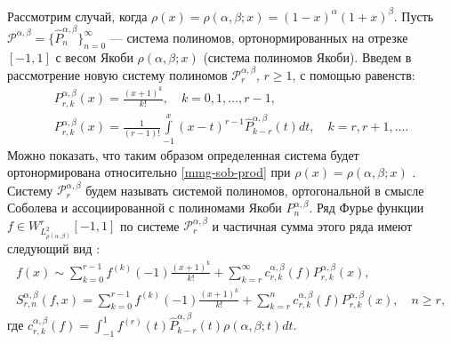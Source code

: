 Рассмотрим случай, когда $\rho(x)=\rho(\alpha,\beta; x)=(1-x)^\alpha(1+x)^\beta$. Пусть $\mathcal{P}^{\alpha,\beta}=\{ \hat{P}_n^{\alpha,\beta} \}_{n=0}^\infty$ --- система полиномов, ортонормированных на отрезке $[-1,1]$ с весом Якоби $\rho(\alpha,\beta; x)$ (система полиномов Якоби). Введем в рассмотрение новую систему полиномов $\mathcal{P}^{\alpha,\beta}_r$, $r \ge 1$, с помощью равенств:
\begin{gather}
	\label{mmg-sob-def1-intro}
	P_{r,k}^{\alpha,\beta}(x) =\frac{(x+1)^k}{k!}, \quad k=0,1,\ldots, r-1,\\
	\label{mmg-sob-def2-intro}
	P_{r,k}^{\alpha,\beta}(x) =\frac{1}{(r-1)!}\int\limits_{-1}^x(x-t)^{r-1}\hat{P}_{k-r}^{\alpha,\beta}(t)dt, \quad k=r,r+1,\ldots.
\end{gather}
Можно показать, что таким образом определенная система будет ортонормирована относительно \eqref{mmg-sob-prod} при $\rho(x)=\rho(\alpha,\beta; x)$ \cite[с.~231]{mmg-Shii-izvran2018}. Систему $\mathcal{P}_r^{\alpha,\beta}$ будем называть системой полиномов, ортогональной в смысле Соболева и ассоциированной с полиномами Якоби $P_n^{\alpha,\beta}$.
Ряд Фурье функции $f \in W^r_{L^2_{\rho(\alpha,\beta)}}[-1,1]$ по системе $\mathcal{P}_r^{\alpha,\beta}$ и частичная сумма этого ряда имеют следующий вид \cite[с.~227]{mmg-Shii-izvran2018}:
\begin{gather}
	\label{mmg-sob-fourier-series-intro}
	f(x) \sim \sum_{k=0}^{r-1} f^{(k)}(-1)\frac{(x+1)^k}{k!}+ \sum_{k=r}^\infty c^{\alpha,\beta}_{r,k}(f) P_{r,k}^{\alpha,\beta}(x),\\
	\label{mmg-sob-part-sum-intro}
	S^{\alpha,\beta}_{r,n}(f,x) = \sum_{k=0}^{r-1} f^{(k)}(-1)\frac{(x+1)^k}{k!}+ \sum_{k=r}^n c^{\alpha,\beta}_{r,k}(f) P_{r,k}^{\alpha,\beta}(x), \quad n \ge r,
\end{gather}
где $c^{\alpha,\beta}_{r,k}(f)=\int_{-1}^1 f^{(r)}(t)\hat{P}_{k-r}^{\alpha,\beta}(t)\rho(\alpha,\beta; t)dt$.

